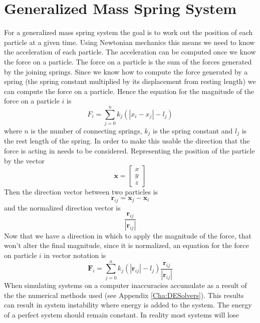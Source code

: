 \section{Generalized Mass Spring System}
\label{sec:massspring}
For a generalized mass spring system the goal is to work out the position of
each particle at a given time. Using Newtonian mechanics this means we need to
know the acceleration of each particle. The acceleration can be computed once we
know the force on a particle. The force on a particle is the sum of the forces
generated by the joining springs. Since we know how to compute the force
generated by a spring (the spring constant multiplied by its displacement from
resting length) we can compute the force on a particle. Hence the equation for
the magnitude of the force on a particle $i$ is
\begin{equation}
   \label{magforce}
	F_i = \sum_{j=0}^{n}k_j\left(\left|{x}_i -
      {x}_j\right|-l_j\right)        
\end{equation}
where $n$ is the number of connecting springs, $k_j$ is the spring constant and
$l_j$ is the rest length of the spring. In order to make this usable the
direction that the force is acting in needs to be considered. Representing the
position of the particle by the vector 
\[
    \mathbf{x} = \begin{bmatrix}
                    x\\
                    y\\
                    z
                 \end{bmatrix}
\] 
Then the direction vector between two particles is
\[
    \mathbf{r}_{ij} = \mathbf{x}_j - \mathbf{x}_i
\]
and the normalized direction vector is 
\[
    \frac{\mathbf{r}_{ij}}{\left|\mathbf{r}_{ij}\right|}
\]
Now that we have a direction in which to apply the magnitude of the force,
that won't alter the final magnitude, since it is normalized, an  
equation for the force on particle $i$ in vector notation is 
\begin{equation}
\label{Eqn:UndampedSpring}
    \mathbf{F}_i = \sum_{j=0}^{n}k_j\left(\left|\mathbf{r}_{ij}\right|-l_j\right)
                    \frac{\mathbf{r}_{ij}}{\left|\mathbf{r}_{ij}\right|}
\end{equation} 
When simulating systems on a computer inaccuracies accumulate as a result of the
the numerical methods used (see Appendix \ref{Cha:DESolvers}). This results can
result in system instability where energy is added to the system. The energy of
a perfect system should remain constant. In reality most systems will lose
